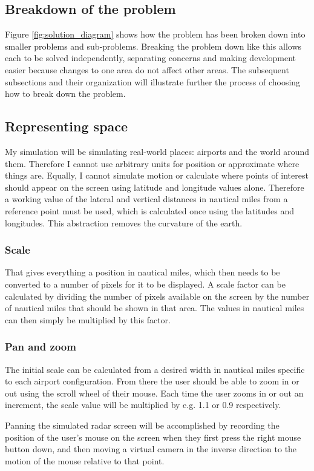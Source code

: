 \documentclass{article}
\begin{document}
\subsection{Breakdown of the problem}
Figure \ref{fig:solution_diagram} shows how the problem has been broken down into smaller problems and sub-problems.
Breaking the problem down like this allows each to be solved independently, separating concerns and making development easier because changes to one area do not affect other areas.
The subsequent subsections and their organization will illustrate further the process of choosing how to break down the problem.


\subsection{Representing space}
My simulation will be simulating real-world places: airports and the world around them.
Therefore I cannot use arbitrary units for position or approximate where things are.
Equally, I cannot simulate motion or calculate where points of interest should appear on the screen using latitude and longitude values alone.
Therefore a working value of the lateral and vertical distances in nautical miles from a reference point must be used, which is calculated once using the latitudes and longitudes.
This abstraction removes the curvature of the earth.

\subsubsection{Scale}
That gives everything a position in nautical miles, which then needs to be converted to a number of pixels for it to be displayed.
A scale factor can be calculated by dividing the number of pixels available on the screen by the number of nautical miles that should be shown in that area.
The values in nautical miles can then simply be multiplied by this factor.

\subsubsection{Pan and zoom}
The initial scale can be calculated from a desired width in nautical miles specific to each airport configuration.
From there the user should be able to zoom in or out using the scroll wheel of their mouse.
Each time the user zooms in or out an increment, the scale value will be multiplied by e.g. 1.1 or 0.9 respectively.

Panning the simulated radar screen will be accomplished by recording the position of the user's mouse on the screen when they first press the right mouse button down, and then moving a virtual camera in the inverse direction to the motion of the mouse relative to that point.
\end{document}
